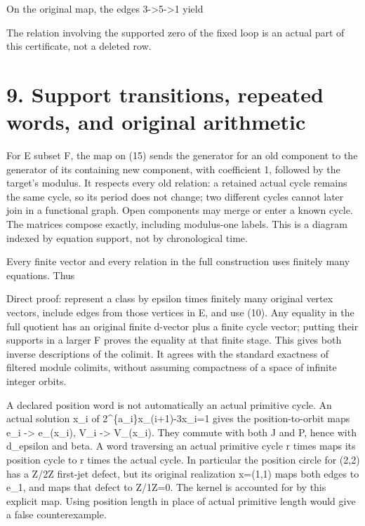 On the original map, the edges 3-\textgreater5-\textgreater1 yield


The relation involving the supported zero of the fixed loop is an actual
part of this certificate, not a deleted row.

\section{9. Support transitions, repeated words, and original
arithmetic}

For E subset F, the map on (15) sends the generator for an old component
to the generator of its containing new component, with coefficient 1,
followed by the target's modulus. It respects every old relation: a
retained actual cycle remains the same cycle, so its period does not
change; two different cycles cannot later join in a functional graph.
Open components may merge or enter a known cycle. The matrices compose
exactly, including modulus-one labels. This is a diagram indexed by
equation support, not by chronological time.

Every finite vector and every relation in the full construction uses
finitely many equations. Thus


Direct proof: represent a class by epsilon times finitely many original
vertex vectors, include edges from those vertices in E, and use (10).
Any equality in the full quotient has an original finite d-vector plus a
finite cycle vector; putting their supports in a larger F proves the
equality at that finite stage. This gives both inverse descriptions of
the colimit. It agrees with the standard exactness of filtered module
colimits, without assuming compactness of a space of infinite integer
orbits.

A declared position word is not automatically an actual primitive cycle.
An actual solution x\_i of 2\^{}\{a\_i\}x\_(i+1)-3x\_i=1 gives the
position-to-orbit maps e\_i -\textgreater{} e\_(x\_i), V\_i
-\textgreater{} V\_(x\_i). They commute with both J and P, hence with
d\_epsilon and beta. A word traversing an actual primitive cycle r times
maps its position cycle to r times the actual cycle. In particular the
position circle for (2,2) has a Z/2Z first-jet defect, but its original
realization x=(1,1) maps both edges to e\_1, and maps that defect to
Z/1Z=0. The kernel is accounted for by this explicit map. Using position
length in place of actual primitive length would give a false
counterexample.

